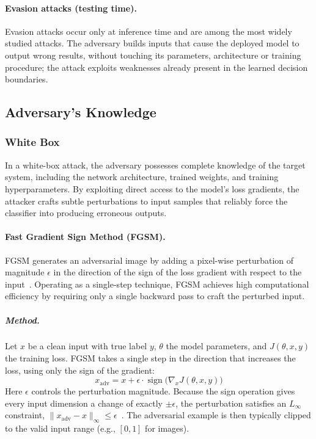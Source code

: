 \documentclass[12pt]{article}
\DeclareMathOperator{\sign}{sign}
\begin{document}
\paragraph{Evasion attacks (testing time).} Evasion attacks occur only at inference time and are among the most widely studied attacks. The adversary builds inputs that cause the deployed model to output wrong results, without touching its parameters, architecture or training procedure; the attack exploits weaknesses already present in the learned decision boundaries.

\subsection{Adversary's Knowledge}

\subsubsection{White Box}

In a white-box attack, the adversary possesses complete knowledge of the target system, including the network architecture, trained weights, and training hyperparameters. By exploiting direct access to the model's loss gradients, the attacker crafts subtle perturbations to input samples that reliably force the classifier into producing erroneous outputs.

\paragraph{Fast Gradient Sign Method (FGSM).} FGSM generates an adversarial image by adding a pixel-wise perturbation of magnitude $\epsilon$ in the direction of the sign of the loss gradient with respect to the input~\cite{goodfellow2015}. Operating as a single-step technique, FGSM achieves high computational efficiency by requiring only a single backward pass to craft the perturbed input.

\subparagraph{Method.} Let $x$ be a clean input with true label $y$, $\theta$ the model parameters, and $J(\theta, x, y)$ the training loss. FGSM takes a single step in the direction that increases the loss, using only the sign of the gradient:
\begin{equation}
  x_{\mathrm{adv}} = x + \epsilon \cdot \sign\!\big(\nabla_x J(\theta, x, y)\big)
\end{equation}
Here $\epsilon$ controls the perturbation magnitude. Because the sign operation gives every input dimension a change of exactly $\pm\epsilon$, the perturbation satisfies an $L_\infty$ constraint, $\lVert x_{\mathrm{adv}} - x \rVert_\infty \le \epsilon$~\cite{goodfellow2015}. The adversarial example is then typically clipped to the valid input range (e.g., $[0,1]$ for images).
\end{document}
